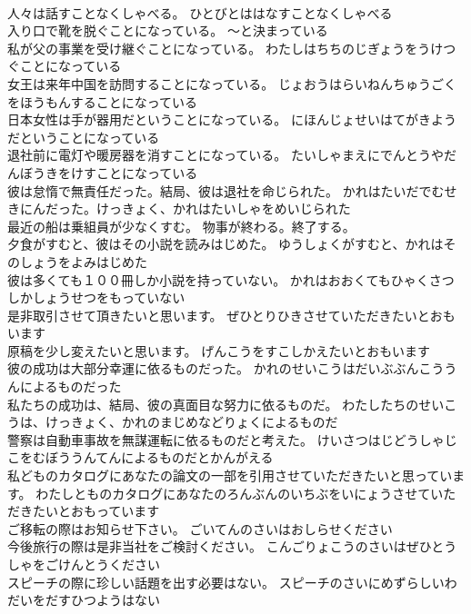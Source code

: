 \documentclass[8pt]{extreport}
\begin{document}
\begin{CJK}{UTF8}{min}
\\	人々は話すことなくしゃべる。	ひとびとははなすことなくしゃべる 
\\	入り口で靴を脱ぐことになっている。	～と決まっている
\\	私が父の事業を受け継ぐことになっている。	わたしはちちのじぎょうをうけつぐことになっている 
\\	女王は来年中国を訪問することになっている。	じょおうはらいねんちゅうごくをほうもんすることになっている 
\\	日本女性は手が器用だということになっている。	にほんじょせいはてがきようだということになっている 
\\	退社前に電灯や暖房器を消すことになっている。	たいしゃまえにでんとうやだんぼうきをけすことになっている 
\\	彼は怠惰で無責任だった。結局、彼は退社を命じられた。	かれはたいだでむせきにんだった。けっきょく、かれはたいしゃをめいじられた 
\\	最近の船は乗組員が少なくすむ。	物事が終わる。終了する。
\\	夕食がすむと、彼はその小説を読みはじめた。	ゆうしょくがすむと、かれはそのしょうをよみはじめた 
\\	彼は多くても１００冊しか小説を持っていない。	かれはおおくてもひゃくさつしかしょうせつをもっていない 
\\	是非取引させて頂きたいと思います。	ぜひとりひきさせていただきたいとおもいます 
\\	原稿を少し変えたいと思います。	げんこうをすこしかえたいとおもいます 
\\	彼の成功は大部分幸運に依るものだった。	かれのせいこうはだいぶぶんこううんによるものだった 
\\	私たちの成功は、結局、彼の真面目な努力に依るものだ。	わたしたちのせいこうは、けっきょく、かれのまじめなどりょくによるものだ 
\\	警察は自動車事故を無謀運転に依るものだと考えた。	けいさつはじどうしゃじこをむぼううんてんによるものだとかんがえる 
\\	私どものカタログにあなたの論文の一部を引用させていただきたいと思っています。	わたしとものカタログにあなたのろんぶんのいちぶをいにょうさせていただきたいとおもっています 
\\	ご移転の際はお知らせ下さい。	ごいてんのさいはおしらせください 
\\	今後旅行の際は是非当社をご検討ください。	こんごりょこうのさいはぜひとうしゃをごけんとうください 
\\	スピーチの際に珍しい話題を出す必要はない。	スピーチのさいにめずらしいわだいをだすひつようはない 

\end{CJK}
\end{document}
